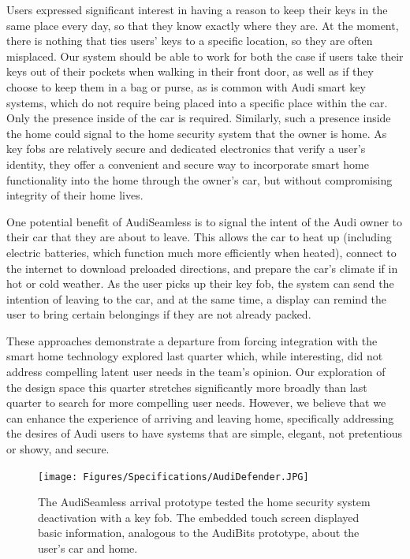 Users expressed significant interest in having a reason to keep their keys in the same place every day, so that they know exactly where they are. At the moment, there is nothing that ties users' keys to a specific location, so they are often misplaced. Our system should be able to work for both the case if users take their keys out of their pockets when walking in their front door, as well as if they choose to keep them in a bag or purse, as is common with Audi smart key systems, which do not require being placed into a specific place within the car. Only the presence inside of the car is required. Similarly, such a presence inside the home could signal to the home security system that the owner is home. As key fobs are relatively secure and dedicated electronics that verify a user's identity, they offer a convenient and secure way to incorporate smart home functionality into the home through the owner's car, but without compromising integrity of their home lives.

One potential benefit of AudiSeamless is to signal the intent of the Audi owner to their car that they are about to leave. This allows the car to heat up (including electric batteries, which function much more efficiently when heated), connect to the internet to download preloaded directions, and prepare the car's climate if in hot or cold weather. As the user picks up their key fob, the system can send the intention of leaving to the car, and at the same time, a display can remind the user to bring certain belongings if they are not already packed.

These approaches demonstrate a departure from forcing integration with the smart home technology explored last quarter which, while interesting, did not address compelling latent user needs in the team's opinion. Our exploration of the design space this quarter stretches significantly more broadly than last quarter to search for more compelling user needs. However, we believe that we can enhance the experience of arriving and leaving home, specifically addressing the desires of Audi users to have systems that are simple, elegant, not pretentious or showy, and secure.

\begin{figure}[ht]
\label{Fig.AudiDefender}
\centering
	\texttt{[image: Figures/Specifications/AudiDefender.JPG]}
	\caption{The AudiSeamless arrival prototype tested the home security system deactivation with a key fob. The embedded touch screen displayed basic information, analogous to the AudiBits prototype, about the user's car and home.}
\end{figure}
